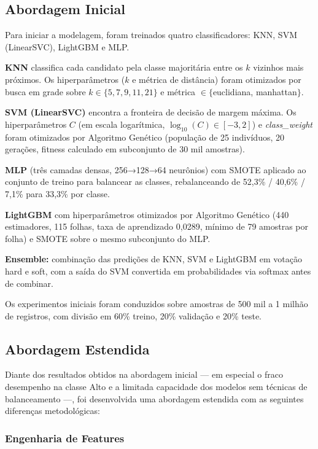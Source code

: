 \documentclass[12pt]{article}
\begin{document}
\subsection{Abordagem Inicial}

Para iniciar a modelagem, foram treinados quatro classificadores: KNN,
SVM (LinearSVC), LightGBM e MLP.

\textbf{KNN} classifica cada candidato pela classe majoritária entre os
$k$ vizinhos mais próximos. Os hiperparâmetros ($k$ e métrica de
distância) foram otimizados por busca em grade sobre $k \in
\{5,7,9,11,21\}$ e métrica $\in \{$euclidiana, manhattan$\}$.

\textbf{SVM (LinearSVC)} encontra a fronteira de decisão de margem
máxima. Os hiperparâmetros $C$ (em escala logarítmica, $\log_{10}(C) \in
[-3,2]$) e \textit{class\_weight} foram otimizados por Algoritmo
Genético (população de 25 indivíduos, 20 gerações, fitness calculado em
subconjunto de 30 mil amostras).

\textbf{MLP} (três camadas densas, 256→128→64 neurônios) com SMOTE
aplicado ao conjunto de treino para balancear as classes, rebalanceando
de 52,3\% / 40,6\% / 7,1\% para 33,3\% por classe.

\textbf{LightGBM} com hiperparâmetros otimizados por Algoritmo Genético
(440 estimadores, 115 folhas, taxa de aprendizado 0,0289, mínimo de 79
amostras por folha) e SMOTE sobre o mesmo subconjunto do MLP.

\textbf{Ensemble:} combinação das predições de KNN, SVM e LightGBM em
votação hard e soft, com a saída do SVM convertida em probabilidades via
softmax antes de combinar.

Os experimentos iniciais foram conduzidos sobre amostras de 500 mil a 1
milhão de registros, com divisão em 60\% treino, 20\% validação e 20\%
teste.

\subsection{Abordagem Estendida}

Diante dos resultados obtidos na abordagem inicial --- em especial o fraco
desempenho na classe Alto e a limitada capacidade dos modelos sem
técnicas de balanceamento ---, foi desenvolvida uma abordagem estendida
com as seguintes diferenças metodológicas:

\subsubsection{Engenharia de Features}
\end{document}
